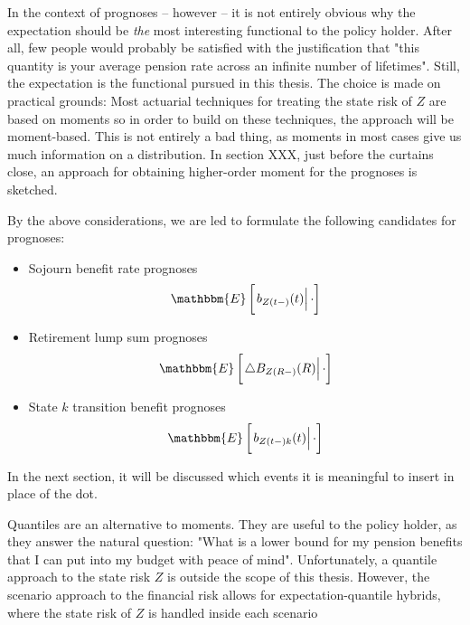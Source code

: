 \documentclass{book}
\newcommand{\1}[1]{\mathbbm{1}_{\left\lbrace #1 \right\rbrace}}
\newcommand{\econd}[2][def]{\mathbbm{E} \left[ \left. #1 \right| #2 \right]}
\theoremstyle{break}
\theoremstyle{remark}
\newenvironment{remark}
  {\pushQED{\qed}\renewcommand{\qedsymbol}{\scalebox{1.4}{$\circ$}}\remarkx}
  {\popQED\endremarkx}
\numberwithin{equation}{section}
\begin{document}
In the context of prognoses -- however -- it is not entirely obvious why the expectation should be \textit{the} most interesting functional to the policy holder. After all, few people would probably be satisfied with the justification that "this quantity is your average pension rate across an infinite number of lifetimes". Still, the expectation is the functional pursued in this thesis. The choice is made on practical grounds: Most actuarial techniques for treating the state risk of $Z$ are based on moments so in order to build on these techniques, the approach will be moment-based. This is not entirely a bad thing, as moments in most cases give us much information on a distribution. In section XXX, just before the curtains close, an approach for obtaining higher-order moment for the prognoses is sketched.

By the above considerations, we are led to formulate the following candidates for prognoses:

\begin{itemize}
    \item Sojourn benefit rate prognoses
    \begin{align*}
        \econd[b_{Z(t-)}(t)]{\cdot}
    \end{align*}
    \item Retirement lump sum prognoses
    \begin{align*}
        \econd[\triangle B_{Z(R-)}(R)]{\cdot}
    \end{align*}
    \item State $k$ transition benefit prognoses
    \begin{align*}
        \econd[b_{Z(t-)k}(t)]{\cdot}
    \end{align*}
\end{itemize}

In the next section, it will be discussed which events it is meaningful to insert in place of the dot.

\begin{remark}
	Quantiles are an alternative to moments. They are useful to the policy holder, as they answer the natural question: "What is a lower bound for my pension benefits that I can put into my budget with peace of mind". Unfortunately, a quantile approach to the state risk $Z$ is outside the scope of this thesis. However, the scenario approach to the financial risk allows for expectation-quantile hybrids, where the state risk of $Z$ is handled inside each scenario
\end{remark}
\end{document}
